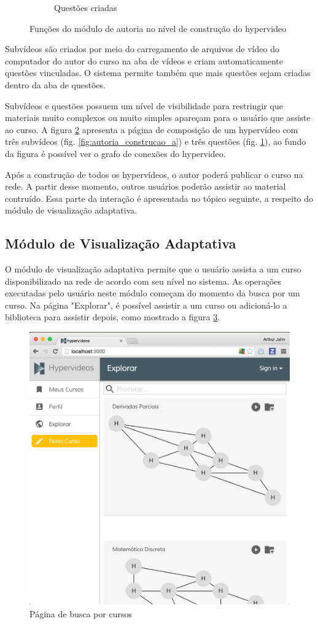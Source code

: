 \begin{figure}[h!]
\begin{subfigure}{.5\textwidth}
  		\caption{Questões criadas}
  		\label{fig:autoria_construcao_b}
	\end{subfigure}%
  	\caption{Funções do módulo de autoria no nível de construção do hypervideo}
  	\label{fig:autoria_construcao}
\end{figure}

Subvídeos são criados por meio do carregamento de arquivos de vídeo do computador do autor do curso na aba de vídeos e criam automaticamente questões vinculadas. O sistema permite também que mais questões sejam criadas dentro da aba de questões. 

Subvídeos e questões possuem um nível de visibilidade para restringir que materiais muito complexos ou muito simples apareçam para o usuário que assiste ao curso. A figura \ref{fig:autoria_construcao} apresenta a página de composição de um hypervídeo com três subvídeos (fig. \ref{fig:autoria_construcao_a}) e três questões (fig. \ref{fig:autoria_construcao_b}), ao fundo da figura é possível ver o grafo de conexões do hypervideo.

Após a construção de todos os hypervídeos, o autor poderá publicar o curso na rede. A partir desse momento, outros usuários poderão assistir ao material contruído. Essa parte da interação é apresentada no tópico seguinte, a respeito do módulo de visualização adaptativa.

\subsection{Módulo de Visualização Adaptativa}

O módulo de visualização adaptativa permite que o usuário assista a um curso disponibilizado na rede de acordo com seu nível no sistema. As operações executadas pelo usuário neste módulo começam do momento da busca por um curso. Na página "Explorar", é possível assistir a um curso ou adicioná-lo a biblioteca para assistir depois, como mostrado a figura \ref{fig:explorar}.

\begin{figure}[h!]
  	\centering
  	\includegraphics[width=.6\linewidth]{figuras/explorar.eps}
  	\caption{Página de busca por cursos}
  	\label{fig:explorar}
\end{figure}

